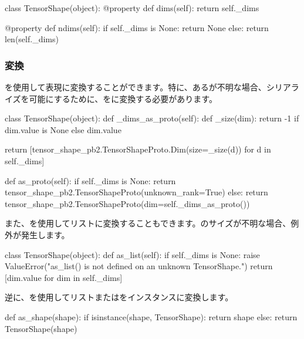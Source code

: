 \begin{content}
\begin{leftbar}
\begin{python}
class TensorShape(object):
  @property
  def dims(self):
    return self._dims

  @property
  def ndims(self):
    if self._dims is None:
      return None
    else:
      return len(self._dims)
\end{python}
\end{leftbar}

\subsubsection{変換}

を使用して表現に変換することができます。特に、あるが不明な場合、シリアライズを可能にするために、をに変換する必要があります。

\begin{leftbar}
\begin{python} 
class TensorShape(object):
  def _dims_as_proto(self): 
    def _size(dim):
      return -1 if dim.value is None else dim.value
    
    return [tensor_shape_pb2.TensorShapeProto.Dim(size=_size(d))
            for d in self._dims]

  def as_proto(self):
    if self._dims is None:
      return tensor_shape_pb2.TensorShapeProto(unknown_rank=True)
    else:
      return tensor_shape_pb2.TensorShapeProto(dim=self._dims_as_proto())
\end{python}
\end{leftbar}

また、を使用してリストに変換することもできます。のサイズが不明な場合、例外が発生します。

\begin{leftbar}
\begin{python} 
class TensorShape(object):
  def as_list(self):
    if self._dims is None:
      raise ValueError("as_list() is not defined on an unknown TensorShape.")
    return [dim.value for dim in self._dims]
\end{python}
\end{leftbar}

逆に、を使用してリストまたはをインスタンスに変換します。

\begin{leftbar}
\begin{python}
def as_shape(shape):
  if isinstance(shape, TensorShape):
    return shape
  else:
    return TensorShape(shape)
\end{python}
\end{leftbar}


\end{content}
